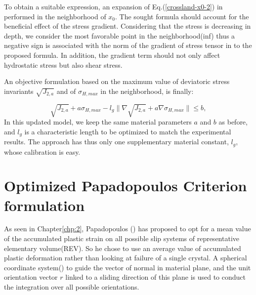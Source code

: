 To obtain a suitable expression, an expansion of Eq.(\ref{crossland-x0-2}) in performed in the neighborhood of ${x_0}$. The sought formula should account for the beneficial effect of the stress gradient. Considering that the stress is decreasing in depth, we consider the most favorable point in the neighborhood(inf) thus  a negative sign is associated with the norm of the gradient of stress tensor in to the proposed formula. In addition, the gradient term should not only affect hydrostatic stress but also shear stress.

An objective formulation based on the maximum value of deviatoric stress invariants $\sqrt{J_{2,a}}$ and of $\sigma_{H,max}$ in the neighborhood, is finally:

\begin{equation}
	\sqrt{J_{2,a}}+a\sigma_{H,max}-l_g\parallel{\nabla\sqrt{J_{2,a}}}+a\nabla{\sigma_{H,max}}\parallel\leqslant b ,
	\label{modified Crossland}
\end{equation}
In this updated model, we keep the same material parameters $a$ and $b$ as before, and $l_g$ is a characteristic length to be optimized to match the experimental results. The approach has thus only one supplementary material constant, $l_g$, whose calibration is easy.

\section{Optimized Papadopoulos Criterion formulation}
As seen in Chapter\ref{chp:2}, Papadopoulos (\cite{papadopoulos1993fatigue}) has proposed to opt for a mean value of the accumulated plastic strain on all possible slip systems of representative elementary volume(REV). So he chose to use an average value  of accumulated plastic deformation rather than looking at failure of a single crystal. A spherical coordinate system() to guide the vector of normal in material plane, and the unit orientation vector $r$ linked to a sliding direction of this plane is used to conduct the integration over all possible orientations.

